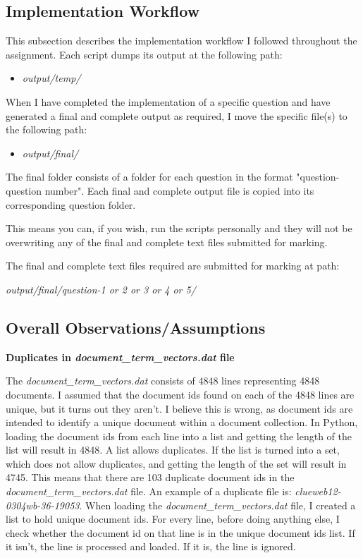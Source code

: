 \documentclass{article} %
\begin{document}
\subsection*{Implementation Workflow}

This subsection describes the implementation workflow I followed throughout the assignment. Each script dumps its output at the following path:

\begin{itemize}
    \item \textit{output/temp/}
\end{itemize}

When I have completed the implementation of a specific question and have generated a final and complete output as required, I move the specific file(s) to the following path:

\begin{itemize}
    \item \textit{output/final/}
\end{itemize}

The final folder consists of a folder for each question in the format "question-question number". Each final and complete output file is copied into its corresponding question folder.

This means you can, if you wish, run the scripts personally and they will not be overwriting any of the final and complete text files submitted for marking.

The final and complete text files required are submitted for marking at path:

\textit{output/final/question-1 or 2 or 3 or 4 or 5/}

\subsection*{Overall Observations/Assumptions}

\textbf{Duplicates in \textit{document\_term\_vectors.dat} file}

The \textit{document\_term\_vectors.dat} consists of 4848 lines representing 4848 documents. I assumed that the document ids found on each of the 4848 lines are unique, but it turns out they aren't. I believe this is wrong, as document ids are intended to identify a unique document within a document collection. In Python, loading the document ids from each line into a list and getting the length of the list will result in 4848. A list allows duplicates. If the list is turned into a set, which does not allow duplicates, and getting the length of the set will result in 4745. This means that there are 103 duplicate document ids in the \textit{document\_term\_vectors.dat} file. An example of a duplicate file is: \textit{clueweb12-0304wb-36-19053}.
When loading the \textit{document\_term\_vectors.dat} file, I created a list to hold unique document ids. For every line, before doing anything else, I check whether the document id on that line is in the unique document ids list. If it isn't, the line is processed and loaded. If it is, the line is ignored.
\end{document}
